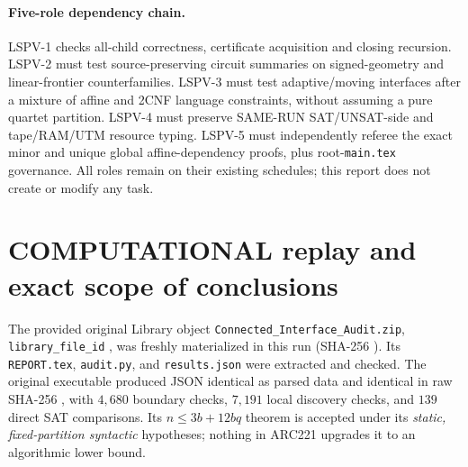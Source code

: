 \documentclass[11pt]{article}
\begin{document}
\paragraph{Five-role dependency chain.}
LSPV-1 checks all-child correctness, certificate acquisition and closing
recursion.  LSPV-2 must test source-preserving circuit summaries on
signed-geometry and linear-frontier counterfamilies.  LSPV-3 must test
adaptive/moving interfaces after a mixture of affine and 2CNF language
constraints, without assuming a pure quartet partition.  LSPV-4 must
preserve SAME-RUN SAT/UNSAT-side and tape/RAM/UTM resource typing.
LSPV-5 must independently referee the exact minor and unique global
affine-dependency proofs, plus root-\texttt{main.tex} governance.
All roles remain on their existing schedules; this report does not create
or modify any task.

\section{COMPUTATIONAL replay and exact scope of conclusions}
The provided original Library object \texttt{Connected\_Interface\_Audit.zip},
\texttt{library\_file\_id}
,
was freshly materialized in this run (SHA-256
{\ttfamily{}}).
Its \texttt{REPORT.tex}, \texttt{audit.py}, and \texttt{results.json} were
extracted and checked.  The original executable produced JSON identical
as parsed data and identical in raw SHA-256
{\ttfamily{}},
with $4{,}680$ boundary checks, $7{,}191$ local discovery checks, and
$139$ direct SAT comparisons.  Its $n\le3b+12bq$ theorem is accepted
under its \emph{static, fixed-partition syntactic} hypotheses; nothing in
ARC221 upgrades it to an algorithmic lower bound.
\end{document}
